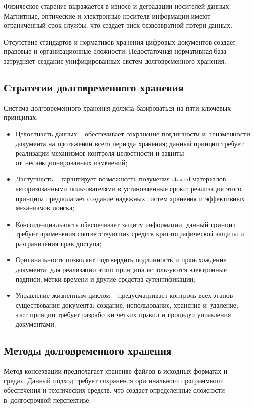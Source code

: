 \documentclass{ou}
\begin{document}
Физическое старение выражается в износе и деградации носителей данных. Магнитные, оптические и электронные носители информации имеют ограниченный срок службы, что создает риск безвозвратной потери данных.

Отсутствие стандартов и нормативов хранения цифровых документов создает правовые и организационные сложности. Недостаточная нормативная база затрудняет создание унифицированных систем долговременного хранения.
\subsection{Стратегии долговременного хранения}
Система долговременного хранения должна базироваться на пяти ключевых принципах:
\begin{itemize}[label=-, leftmargin=0em, itemindent=3.35em, nosep]
\item Целостность данных -- обеспечивает сохранение подлинности и~неизменности документа на протяжении всего периода хранения; данный принцип требует реализации механизмов контроля целостности и защиты от~несанкционированных изменений;
\item Доступность -- гарантирует возможность получения stored материалов авторизованными пользователями в установленные сроки; реализация этого принципа предполагает создание надежных систем хранения и эффективных механизмов поиска;
\item Конфиденциальность обеспечивает защиту информации, данный принцип требует применения соответствующих средств криптографической защиты и разграничения прав доступа;
\item Оригинальность позволяет подтвердить подлинность и происхождение документа; для реализации этого принципа используются электронные подписи, метки времени и другие средства аутентификации;
\item Управление жизненным циклом -- предусматривает контроль всех этапов существования документа: создание, использование, хранение и~удаление; этот принцип требует разработки четких правил и процедур управления документами.
\end{itemize}
\subsection{Методы долговременного хранения}
Метод консервации предполагает хранение файлов в исходных форматах и средах. Данный подход требует сохранения оригинального программного обеспечения и технических средств, что создает определенные сложности в~долгосрочной перспективе.
\end{document}
